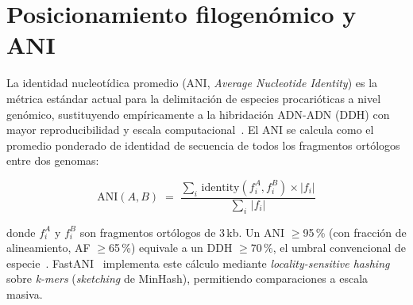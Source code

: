 \begin{table}[htbp]
  \centering
  \caption{Categorías de calidad MIMAG para MAGs bacterianos y
  arqueales~\cite{bowers2017}.}
  \label{tab:mimag}
\end{table}

\section{Posicionamiento filogenómico y ANI}
\label{sec:phylogenomics}

La identidad nucleotídica promedio (ANI, \textit{Average Nucleotide
Identity}) es la métrica estándar actual para la delimitación de
especies procarióticas a nivel genómico, sustituyendo empíricamente a
la hibridación ADN-ADN (DDH) con mayor reproducibilidad y escala
computacional~\cite{fastANI2018}. El ANI se calcula como el promedio
ponderado de identidad de secuencia de todos los fragmentos ortólogos
entre dos genomas:

\begin{equation}
  \mathrm{ANI}(A,B) \;=\;
  \frac{\displaystyle\sum_{i}\, \mathrm{identity}(f_i^A, f_i^B) \times |f_i|}
       {\displaystyle\sum_{i}\, |f_i|}
  \label{eq:ani}
\end{equation}

\noindent donde $f_i^A$ y $f_i^B$ son fragmentos ortólogos de 3\,kb.
Un ANI $\geq$95\,\% (con fracción de alineamiento, AF $\geq$65\,\%)
equivale a un DDH $\geq$70\,\%, el umbral convencional de
especie~\cite{fastANI2018, gtdbtk2019}. FastANI~\cite{fastANI2018} implementa este
cálculo mediante \textit{locality-sensitive hashing} sobre
\textit{k-mers} (\textit{sketching} de MinHash), permitiendo
comparaciones a escala masiva.

